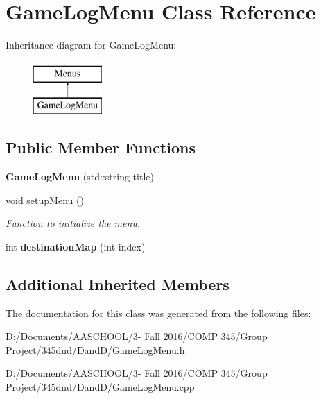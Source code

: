 \hypertarget{class_game_log_menu}{}\section{Game\+Log\+Menu Class Reference}
\label{class_game_log_menu}
Inheritance diagram for Game\+Log\+Menu\+:\begin{figure}[H]
\begin{center}
\leavevmode
\includegraphics[height=2.000000cm]{class_game_log_menu}
\end{center}
\end{figure}
\subsection*{Public Member Functions}
\begin{DoxyCompactItemize}
\item 
\hypertarget{class_game_log_menu_afd50332bdd8af9165cda8ea181fec484}{}\label{class_game_log_menu_afd50332bdd8af9165cda8ea181fec484} 
{\bfseries Game\+Log\+Menu} (std\+::string title)
\item 
\hypertarget{class_game_log_menu_aeb4ec7c349d3cdc8f2658ede2f23a3d4}{}\label{class_game_log_menu_aeb4ec7c349d3cdc8f2658ede2f23a3d4} 
void \hyperlink{class_game_log_menu_aeb4ec7c349d3cdc8f2658ede2f23a3d4}{setup\+Menu} ()
\begin{DoxyCompactList}\small\item\em Function to initialize the menu. \end{DoxyCompactList}\item 
\hypertarget{class_game_log_menu_a8c8d17b9bcd0b43d0126c36f8078ba66}{}\label{class_game_log_menu_a8c8d17b9bcd0b43d0126c36f8078ba66} 
int {\bfseries destination\+Map} (int index)
\end{DoxyCompactItemize}
\subsection*{Additional Inherited Members}


The documentation for this class was generated from the following files\+:\begin{DoxyCompactItemize}
\item 
D\+:/\+Documents/\+A\+A\+S\+C\+H\+O\+O\+L/3-\/ Fall 2016/\+C\+O\+M\+P 345/\+Group Project/345dnd/\+Dand\+D/Game\+Log\+Menu.\+h\item 
D\+:/\+Documents/\+A\+A\+S\+C\+H\+O\+O\+L/3-\/ Fall 2016/\+C\+O\+M\+P 345/\+Group Project/345dnd/\+Dand\+D/Game\+Log\+Menu.\+cpp\end{DoxyCompactItemize}
